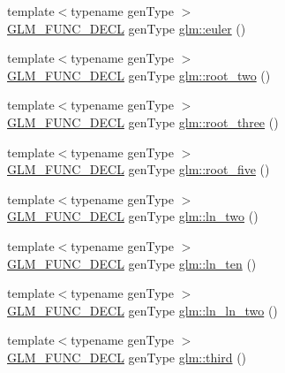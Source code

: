 \begin{DoxyCompactItemize}
\item 
{\footnotesize template$<$typename gen\+Type $>$ }\\\hyperlink{setup_8hpp_ab2d052de21a70539923e9bcbf6e83a51}{G\+L\+M\+\_\+\+F\+U\+N\+C\+\_\+\+D\+E\+CL} gen\+Type \hyperlink{group__gtc__constants_ga6f14b46653b7ead1edcbd0fc6c9c5289}{glm\+::euler} ()
\item 
{\footnotesize template$<$typename gen\+Type $>$ }\\\hyperlink{setup_8hpp_ab2d052de21a70539923e9bcbf6e83a51}{G\+L\+M\+\_\+\+F\+U\+N\+C\+\_\+\+D\+E\+CL} gen\+Type \hyperlink{group__gtc__constants_gab91b7799f88f9f2be33e385dec11b9c2}{glm\+::root\+\_\+two} ()
\item 
{\footnotesize template$<$typename gen\+Type $>$ }\\\hyperlink{setup_8hpp_ab2d052de21a70539923e9bcbf6e83a51}{G\+L\+M\+\_\+\+F\+U\+N\+C\+\_\+\+D\+E\+CL} gen\+Type \hyperlink{group__gtc__constants_gab3183635ac615473e2f95852f491be83}{glm\+::root\+\_\+three} ()
\item 
{\footnotesize template$<$typename gen\+Type $>$ }\\\hyperlink{setup_8hpp_ab2d052de21a70539923e9bcbf6e83a51}{G\+L\+M\+\_\+\+F\+U\+N\+C\+\_\+\+D\+E\+CL} gen\+Type \hyperlink{group__gtc__constants_gace2b8dfed1ab9fabbb67dde08e7e5b58}{glm\+::root\+\_\+five} ()
\item 
{\footnotesize template$<$typename gen\+Type $>$ }\\\hyperlink{setup_8hpp_ab2d052de21a70539923e9bcbf6e83a51}{G\+L\+M\+\_\+\+F\+U\+N\+C\+\_\+\+D\+E\+CL} gen\+Type \hyperlink{group__gtc__constants_ga22fae798430edc3022766af4fd83e8a4}{glm\+::ln\+\_\+two} ()
\item 
{\footnotesize template$<$typename gen\+Type $>$ }\\\hyperlink{setup_8hpp_ab2d052de21a70539923e9bcbf6e83a51}{G\+L\+M\+\_\+\+F\+U\+N\+C\+\_\+\+D\+E\+CL} gen\+Type \hyperlink{group__gtc__constants_ga48addf0cb0980277d208a71a1c59c073}{glm\+::ln\+\_\+ten} ()
\item 
{\footnotesize template$<$typename gen\+Type $>$ }\\\hyperlink{setup_8hpp_ab2d052de21a70539923e9bcbf6e83a51}{G\+L\+M\+\_\+\+F\+U\+N\+C\+\_\+\+D\+E\+CL} gen\+Type \hyperlink{group__gtc__constants_ga650774609debe4a90bcac449b574de2c}{glm\+::ln\+\_\+ln\+\_\+two} ()
\item 
{\footnotesize template$<$typename gen\+Type $>$ }\\\hyperlink{setup_8hpp_ab2d052de21a70539923e9bcbf6e83a51}{G\+L\+M\+\_\+\+F\+U\+N\+C\+\_\+\+D\+E\+CL} gen\+Type \hyperlink{group__gtc__constants_gabf280496105e0ad070287417f840ebd8}{glm\+::third} ()

\end{DoxyCompactItemize}
